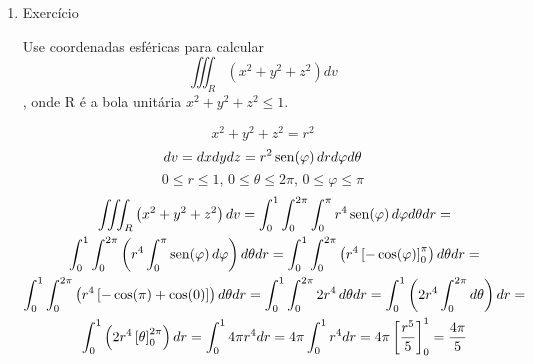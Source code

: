 \begin{enumerate}
	\item Exercício
	
	Use coordenadas esféricas para calcular $$\iiint_R\left(x^2+y^2+z^2\right)dv$$, onde R é a bola unitária $x^2+y^2+z^2 \leq 1$.
	
	\begin{equation*}
		x^2+y^2+z^2 = r^2
	\end{equation*}
	\begin{equation*}
		dv = dxdydz = r^2 \operatorname{sen}(\varphi)\, dr d\varphi d\theta
	\end{equation*}
	\begin{equation*}
		0 \leq r \leq 1,\, 0 \leq \theta \leq 2\pi,\, 0 \leq \varphi \leq \pi
	\end{equation*} 
	\begin{gather*}
		\iiint_R\left(x^2+y^2+z^2\right)dv = \int_0^1 \int_0^{2\pi} \int_0^{\pi} r^4\operatorname{sen}(\varphi)\, d\varphi d\theta dr =\\ \int_0^1 \int_0^{2\pi} \left(r^4 \int_0^{\pi} \operatorname{sen}(\varphi)\, d\varphi\right)d\theta dr = \int_0^1 \int_0^{2\pi} \left(r^4\left[-\cos(\varphi)\right]_0^{\pi}  \right)d\theta dr =\\ \int_0^1 \int_0^{2\pi} \left(r^4\left[-\cos(\pi) + \cos(0 )\right]  \right)d\theta dr = \int_0^1 \int_0^{2\pi} 2r^4\, d\theta dr = \int_0^1\left(2r^4\int_0^{2\pi} d\theta\right) dr =\\ \int_0^1\left(2r^4\left[\theta\right]_0^{2\pi}\right) dr = \int_0^1 4\pi r^4 dr = 4\pi\int_0^1 r^4 dr = 4\pi\left[\dfrac{r^5}{5}\right]_0^1 = \dfrac{4\pi}{5}
	\end{gather*}
\end{enumerate}